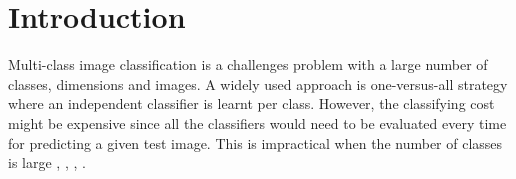 \documentclass[review]{elsarticle}
\begin{document}
\section{Introduction}
\label{intro}

Multi-class image classification is a challenges problem with a large number of classes, dimensions and images. A widely used approach is one-versus-all strategy where an independent classifier is learnt per class. However, the classifying cost might be expensive since all the classifiers would need to be evaluated every time for predicting a given test image. This is impractical when the number of classes is large \cite{DengECCV2010}, \cite{Akata.TPAMI2013}, \cite{ILSVRC15}, \cite{HOSong15PAMI}. 
\end{document}
